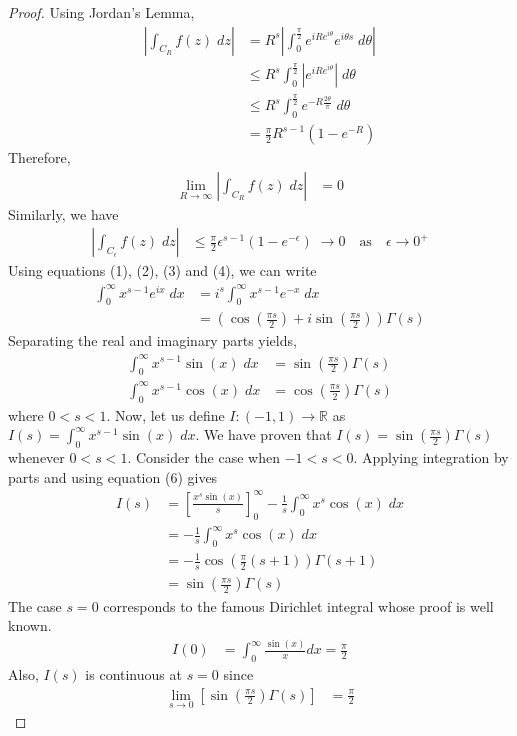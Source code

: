 \begin{proof}
Using Jordan's Lemma,
\begin{align*}
\left|\int_{C_R} f(z)\; dz\right| &= R^s \left| \int_0^{\frac{\pi}{2}} e^{i R e^{i\theta}} e^{i\theta s} \; d\theta\right| \\
&\leq R^s \int_0^{\frac{\pi}{2}} \left| e^{i R e^{i\theta}} \right| \; d\theta \\
&\leq R^s \int_0^{\frac{\pi}{2}} e^{-R \frac{2\theta}{\pi}}\; d\theta \\
&= \frac{\pi}{2}R^{s-1} \left(1-e^{-R} \right)
\end{align*}
Therefore, 
\begin{align*}
\lim_{R\to \infty}\left|\int_{C_R} f(z)\; dz\right| &= 0 \tag{3}
\end{align*}
Similarly, we have
\begin{align*}
\left|\int_{C_\epsilon} f(z)\; dz\right| &\leq  \frac{\pi}{2}\epsilon^{s-1} \left(1-e^{-\epsilon} \right)\; \to 0 \quad \text{as} \quad \epsilon \to 0^+ \tag{4}
\end{align*}
Using equations (1), (2), (3) and (4), we can write
\begin{align*}
\int_0^\infty x^{s-1} e^{ix} \; dx &= i^s \int_0^\infty x^{s-1} e^{-x}\; dx \\
&= \left(\cos\left(\frac{\pi s}{2}\right) + i \sin\left(\frac{\pi s}{2}\right) \right) \Gamma(s)
\end{align*}
Separating the real and imaginary parts yields,
\begin{align*}
\int_0^\infty x^{s-1} \sin(x) \; dx &= \sin\left(\frac{\pi s}{2}\right)\Gamma(s) \tag{5}\\
\int_0^\infty x^{s-1} \cos(x) \; dx &= \cos\left(\frac{\pi s}{2}\right)\Gamma(s) \tag{6}
\end{align*}
where $0<s<1$. 
Now, let us define $I:(-1,1) \to \mathbb{R}$ as $I(s) = \int_0^\infty x^{s-1} \sin(x) \; dx$. We have proven that $I(s)=\sin\left(\frac{\pi s}{2}\right)\Gamma(s)$ whenever $0<s<1$. 
Consider the case when $-1<s<0$. Applying integration by parts and using equation (6) gives
\begin{align*}
I(s) &= \left[ \frac{x^s \sin(x)}{s} \right]_0^\infty - \frac{1}{s}\int_0^\infty x^s \cos(x) \; dx \\
&= -\frac{1}{s} \int_0^\infty x^s \cos(x) \; dx \\
&= -\frac{1}{s} \cos\left(\frac{\pi}{2}(s+1) \right)\Gamma(s+1) \\
&=  \sin\left(\frac{\pi s}{2}\right)\Gamma(s)
\end{align*}
The case $s=0$ corresponds to the famous Dirichlet integral whose proof is well known.
\begin{align*}
I(0) &= \int_0^\infty \frac{\sin (x)}{x}dx = \frac{\pi}{2}
\end{align*}
Also, $I(s)$ is continuous at $s=0$ since
\begin{align*}
\lim_{s\to 0} \left[ \sin\left(\frac{\pi s}{2}\right)\Gamma(s) \right]&= \frac{\pi}{2}
\end{align*}
\end{proof}

